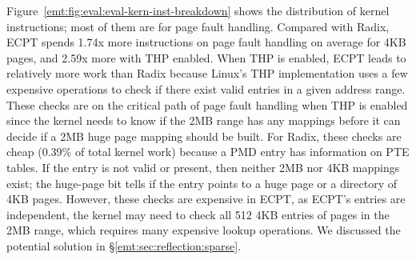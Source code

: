 \label{emt:ss:eval:eval-ecpt-os}
Figure~\ref{emt:fig:eval:eval-kern-inst-breakdown} shows the distribution of kernel instructions;
	most of them are for page fault handling. %
Compared with Radix, ECPT spends 1.74x more instructions on page fault handling on average for 4KB pages,
	and 2.59x more with THP enabled. 
When THP is enabled, ECPT leads to relatively more work than Radix
	because Linux's THP implementation uses
	a few expensive operations to check
	if there exist valid entries in a given address range. %
These checks are on the critical path of page fault handling when THP is enabled
	since the kernel needs to know if the 2MB range has any mappings %
	before it can decide if a 2MB huge page mapping should be built. %
For Radix, these checks are cheap (0.39\% of total kernel work)
	because a PMD entry has information on PTE tables. %
If the entry is not valid or present, then neither 2MB nor 4KB mappings exist;
the huge-page bit tells if the entry points to a huge page or a directory of 4KB pages.
However, these checks are expensive in ECPT, as
	ECPT's entries are independent,
	the kernel may need to check all 512 4KB entries of pages in 
	the 2MB range, which requires many expensive lookup operations.
We discussed the potential solution %
	in \S\ref{emt:sec:reflection:sparse}.



